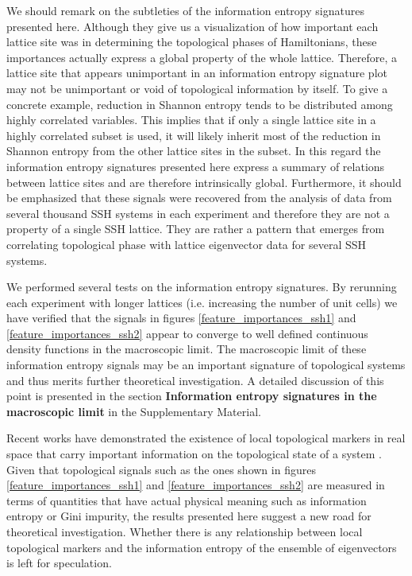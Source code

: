 \documentclass[fleqn,10pt]{wlscirep}
\begin{document}
We should remark on the subtleties of the information entropy signatures presented here. Although they give us a visualization of how important each lattice site was in determining the topological phases of Hamiltonians, these importances actually express a global property of the whole lattice. Therefore, a lattice site that appears unimportant in an information entropy signature plot may not be unimportant or void of topological information by itself. To give a concrete example, reduction in Shannon entropy tends to be distributed among highly correlated variables. This implies that if only a single lattice site in a highly correlated subset is used, it will likely inherit most of the reduction in Shannon entropy from the other lattice sites in the subset. In this regard the information entropy signatures presented here express a summary of relations between lattice sites and are therefore intrinsically global. Furthermore, it should be emphasized that these signals were recovered from the analysis of data from several thousand SSH systems in each experiment and therefore they are not a property of a single SSH lattice. They are rather a pattern that emerges from correlating topological phase with lattice eigenvector data for several SSH systems.   

We performed several tests on the information entropy signatures. By rerunning each experiment with longer lattices (i.e. increasing the number of unit cells) we have verified that the signals in figures \ref{feature_importances_ssh1} and \ref{feature_importances_ssh2} appear to converge to well defined continuous density functions in the macroscopic limit. The macroscopic limit of these information entropy signals may be an important signature of topological systems and thus merits further theoretical investigation. A detailed discussion of this point is presented in the section \textbf{Information entropy signatures in the macroscopic limit} in the Supplementary Material.

Recent works have demonstrated the existence of local topological markers in real space that carry important information on the topological state of a system \cite{PhysRevB.84.241106,caio2019topological}.  Given that topological signals such as the ones shown in figures \ref{feature_importances_ssh1} and \ref{feature_importances_ssh2} are measured in terms of quantities that have actual physical meaning such as information entropy or Gini impurity, the results presented here suggest a new road for theoretical investigation. Whether there is any relationship between local topological markers and the information entropy of the ensemble of eigenvectors is left for speculation.
\end{document}
